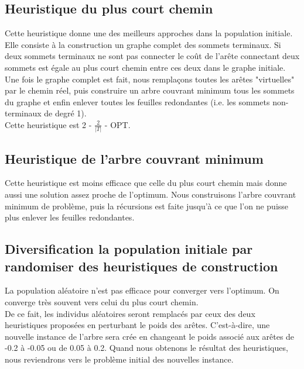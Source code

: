 \documentclass[12pt,a4paper]{article}
\begin{document}
\subsection{Heuristique du plus court chemin}
Cette heuristique donne une des meilleurs approches dans la population initiale. Elle consiste à la construction un graphe complet des sommets terminaux. Si deux sommets terminaux ne sont pas connecter le coût de l'arête connectant deux sommets est égale au plus court chemin entre ces deux dans le graphe initiale. Une fois le graphe complet est fait, nous remplaçons toutes les arêtes "virtuelles" par le chemin réel, puis construire un arbre couvrant minimum tous les sommets du graphe et enfin enlever toutes les feuilles redondantes (i.e. les sommets non-terminaux de degré 1).\\
Cette heuristique est 2 - $\frac{2}{|T|}$ - OPT.
\subsection{Heuristique de l'arbre couvrant minimum}
Cette heuristique est moins efficace que celle du plus court chemin mais donne aussi une solution assez proche de l'optimum. Nous construisons l'arbre couvrant minimum de problème, puis la récursions est faite jusqu'à ce que l'on ne puisse plus enlever les feuilles redondantes.
\subsection{Diversification la population initiale par randomiser des heuristiques de construction}
La population aléatoire n'est pas efficace pour converger vers l'optimum. On converge très souvent vers celui du plus court chemin.\\
De ce fait, les individus aléatoires seront remplacés par ceux des deux heuristiques proposées en perturbant le poids des arêtes. C'est-à-dire, une nouvelle instance de l'arbre sera crée en changeant le poids associé aux arêtes de -0.2 à -0.05 ou de 0.05 à 0.2. Quand nous obtenons le résultat des heuristiques, nous reviendrons vers le problème initial des nouvelles instance.
\end{document}
